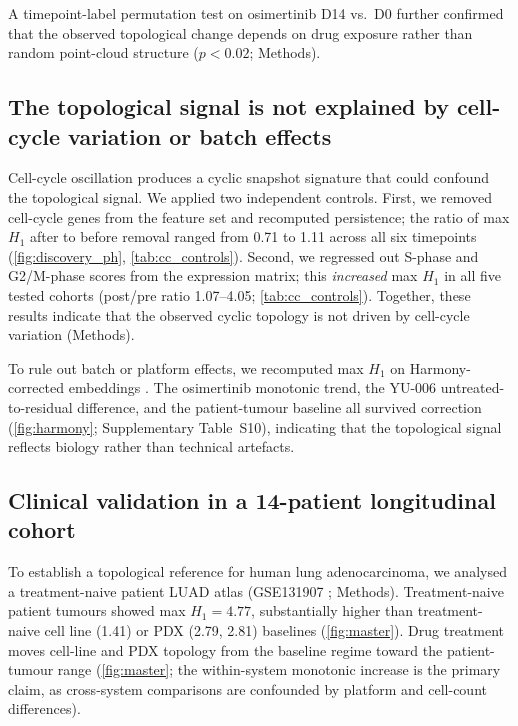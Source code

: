 A timepoint-label permutation test on osimertinib D14 vs.\ D0 further
confirmed that the observed topological change depends on drug exposure
rather than random point-cloud structure ($p < 0.02$; Methods).

\subsection*{The topological signal is not explained by cell-cycle
variation or batch effects}

Cell-cycle oscillation produces a cyclic snapshot signature that could
confound the topological signal. We applied two independent controls.
First, we removed cell-cycle genes from the feature set and recomputed
persistence; the ratio of max $H_1$ after to before removal ranged from
0.71 to 1.11 across all six timepoints
(\cref{fig:discovery_ph}, \cref{tab:cc_controls}). Second, we
regressed out S-phase and G2/M-phase scores from the expression matrix;
this \emph{increased} max $H_1$ in all five tested cohorts
(post/pre ratio 1.07--4.05; \cref{tab:cc_controls}).
Together, these results indicate that the observed cyclic topology is
not driven by cell-cycle variation (Methods).

To rule out batch or platform effects, we recomputed max $H_1$ on
Harmony-corrected embeddings \citep{korsunsky2019}. The osimertinib
monotonic trend, the YU-006 untreated-to-residual difference, and the
patient-tumour baseline all survived correction
(\cref{fig:harmony}; Supplementary Table~S10), indicating that the
topological signal reflects biology rather than technical artefacts.

\subsection*{Clinical validation in a 14-patient longitudinal cohort}

To establish a topological reference for human lung adenocarcinoma, we
analysed a treatment-naive patient LUAD atlas (GSE131907
\citep{kim2020}; Methods). Treatment-naive patient tumours showed
max $H_1 = 4.77$, substantially higher than treatment-naive cell line
(1.41) or PDX (2.79, 2.81) baselines (\cref{fig:master}). Drug
treatment moves cell-line and PDX topology from the baseline regime
toward the patient-tumour range (\cref{fig:master}; the within-system
monotonic increase is the primary claim, as cross-system comparisons
are confounded by platform and cell-count differences).

